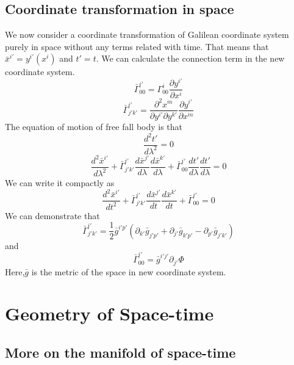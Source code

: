 \section{Coordinate transformation in space}
\noindent
We now consider a coordinate transformation of Galilean coordinate system purely in space without any terms related with time. That means that $\bar{x}^{i'} = y^{i'}(x^{i})$ and $t'=t$. We can calculate the connection term in the new coordinate system.
\[\bar{\Gamma}^{i'}_{00} = \Gamma^{i}_{00} \frac{\partial y^{i'}}{\partial x^{i}}\]
\[\bar{\Gamma}^{i'}_{j'k'} = \frac{\partial^2 x^{m}}{\partial y^{i'}\partial y^{k'}} \frac{\partial y^{i'}}{\partial x^{m}}\]
The equation of motion of free fall body is that
\[\frac{d^2 t'}{d\lambda^2} = 0\]
\[\frac{d^2 \bar{x}^{i'}}{d\lambda^2} + \bar{\Gamma}^{i'}_{j' k'} \frac{d\bar{x}^{j'}}{d \lambda} \frac{d\bar{x}^{k'}}{d \lambda} + \bar{\Gamma}^{i'}_{0 0} \frac{dt'}{d \lambda} \frac{dt'}{d \lambda}=0\]
We can write it compactly as 
\[\frac{d^2 \bar{x}^{i'}}{dt^2} + \bar{\Gamma}^{i'}_{j' k'} \frac{d\bar{x}^{j'}}{dt} \frac{d\bar{x}^{k'}}{dt} + \bar{\Gamma}^{i'}_{0 0}=0\]
We can demonstrate that
\[\bar{\Gamma}^{i'}_{j'k'} = \frac{1}{2} \bar{g}^{i'p'}(\partial_{k'}\bar{g}_{j'p'}+\partial_{j'}\bar{g}_{k'p'}-\partial_{p'}\bar{g}_{j'k'})\]
and
\[\bar{\Gamma}^{i'}_{00} = \bar{g}^{i'j'}\partial_{j'}\Phi\]
Here,$\bar{g}$ is the metric of the space in new coordinate system.

\chapter{Geometry of Space-time}
\section{More on the manifold of space-time}
